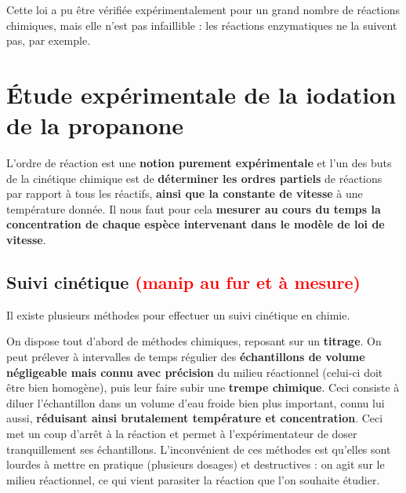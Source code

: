 \documentclass[11pt,a4paper]{report}
\begin{document}
Cette loi a pu être vérifiée expérimentalement pour un grand nombre de réactions chimiques, mais elle n'est pas infaillible : les réactions enzymatiques ne la suivent pas, par exemple.


\section{Étude expérimentale de la iodation de la propanone}\label{sec:2}

L'ordre de réaction est une \textbf{notion purement expérimentale} et l'un des buts de la cinétique chimique est de \textbf{déterminer les ordres partiels} de réactions par rapport à tous les réactifs, \textbf{ainsi que la constante de vitesse} à une température donnée. Il nous faut pour cela \textbf{mesurer au cours du temps la concentration de chaque espèce intervenant dans le modèle de loi de vitesse}.

\subsection{Suivi cinétique \textcolor{red}{(manip au fur et à mesure)}}

Il existe plusieurs méthodes pour effectuer un suivi cinétique en chimie.

On dispose tout d'abord de méthodes chimiques, reposant sur un \textbf{titrage}. On peut prélever à intervalles de temps régulier des \textbf{échantillons de volume négligeable mais connu avec précision} du milieu réactionnel (celui-ci doit être bien homogène), puis leur faire subir une \textbf{trempe chimique}. Ceci consiste à diluer l'échantillon dans un volume d'eau froide bien plus important, connu lui aussi, \textbf{réduisant ainsi brutalement température et concentration}. Ceci met un coup d'arrêt à la réaction et permet à l'expérimentateur de doser tranquillement ses échantillons. L'inconvénient de ces méthodes est qu'elles sont lourdes à mettre en pratique (plusieurs dosages) et destructives : on agit sur le milieu réactionnel, ce qui vient parasiter la réaction que l'on souhaite étudier.\\
\end{document}

